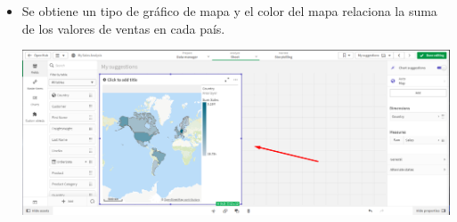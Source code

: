 \documentclass[12pt,letterpaper]{article}
\newcommand\tab[1][1cm]{\hspace*{#1}}
\begin{document}
\begin{enumerate}[\tab 1.]
\begin{center}
        \end{center}
        \begin{itemize}
            \item Se obtiene un tipo de gráfico de mapa y el color del mapa relaciona la suma de los valores de ventas en cada país.
            \begin{center}
                \includegraphics[width=13cm]{./img/img18.1.png}
            \end{center}
        \end{itemize}
    \end{enumerate}
\end{document}
